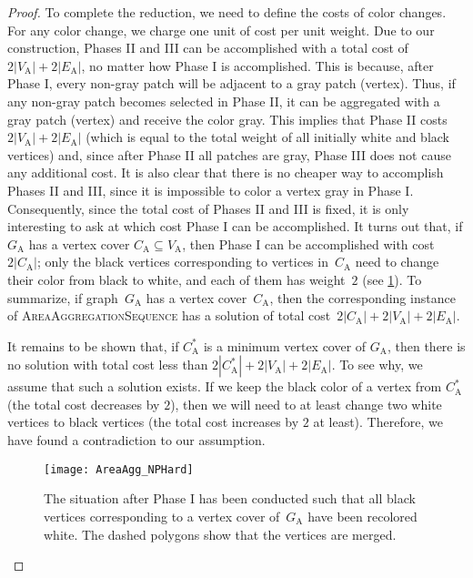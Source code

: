\documentclass[acmsmall,natbib=false]{acmart}
\begin{document}
\begin{proof}
To complete the reduction, 
we need to define the costs of color changes. 
For any color change, 
we charge one unit of cost per unit weight.
Due to our construction, Phases II and III can be accomplished with
a total cost of~$2|V_\mathrm{A}|+2|E_\mathrm{A}|$, 
no matter how Phase I is accomplished.
This is because, after Phase I, 
every non-gray patch will be adjacent to a gray patch (vertex).
Thus, if any non-gray patch becomes selected in Phase II, 
it can be aggregated with a gray patch (vertex) and 
receive the color gray. 
This implies that Phase II costs $2|V_\mathrm{A}|+2|E_\mathrm{A}|$ 
(which is equal to the total weight of 
all initially white and black vertices) and, 
since after Phase II all patches are gray, 
Phase III does not cause any additional cost.  
It is also clear that 
there is no cheaper way to accomplish Phases II and III,
since it is impossible to color a vertex gray in Phase I.
Consequently, since the total cost of Phases II and III is fixed, 
it is only interesting to ask 
at which cost Phase I can be accomplished.
It turns out that, if $G_\mathrm{A}$ 
has a vertex cover $C_\mathrm{A} \subseteq V_\mathrm{A}$, 
then Phase I can be accomplished with cost $2|C_\mathrm{A}|$;
only the black vertices corresponding to vertices in~$C_\mathrm{A}$ 
need to change their color from black to white, and 
each of them has weight~$2$ (see \fig\ref{fig:reduction2}).
To summarize, if graph~$G_\mathrm{A}$ has a vertex cover~$C_\mathrm{A}$, 
then the corresponding instance of \textsc{AreaAggregationSequence} 
has a solution of 
total cost~$2|C_\mathrm{A}|+2|V_\mathrm{A}|+2|E_\mathrm{A}|$.

It remains to be shown that, 
if $C_\mathrm{A}^*$ is a minimum vertex cover of $G_\mathrm{A}$, 
then there is no solution with total cost 
less than $2|C_\mathrm{A}^*|+2|V_\mathrm{A}|+2|E_\mathrm{A}|$.
To see why, we assume that such a solution exists.
If we keep the black color of a vertex from $C_\mathrm{A}^*$ 
(the total cost decreases by $2$),
then we will need to at least change two white vertices
to black vertices
(the total cost increases by $2$ at least).
Therefore, we have found a contradiction to our assumption.

\begin{figure}[tb]
\centering
\texttt{[image: AreaAgg\_NPHard]}
\caption{The situation after Phase I has been conducted 
    such that all black vertices corresponding to a vertex cover 
    of~$G_\mathrm{A}$ have been recolored white.
    The dashed polygons show that the vertices are merged.}
\label{fig:reduction2}
\end{figure}
\end{proof}
\end{document}
